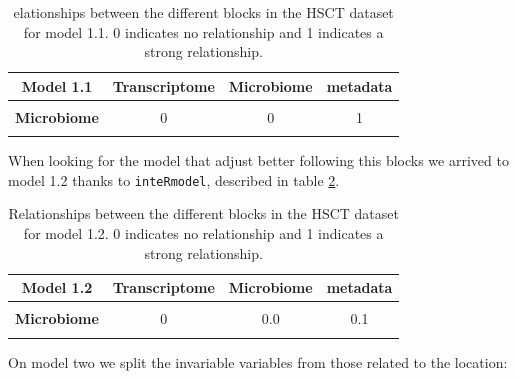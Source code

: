 \documentclass[
  12pt,
  a4paper,
  twoside,
  openright]{book}
\begin{document}
\begin{table}[H]

\caption[Model 1.1 the of HSCT dataset.]{\label{tab:hsct-model1-1}elationships between the different blocks in the HSCT dataset for model 1.1. 0 indicates no relationship and 1 indicates a strong relationship.}
\centering
\begin{tabular}[t]{>{}c|c|c|c}
\hline
\textbf{Model 1.1} & \textbf{Transcriptome} & \textbf{Microbiome} & \textbf{metadata}\\
\hline
\textbf{\cellcolor{gray!6}{Transcriptome}} & \cellcolor{gray!6}{0} & \cellcolor{gray!6}{0} & \cellcolor{gray!6}{1}\\
\hline
\textbf{Microbiome} & 0 & 0 & 1\\
\hline
\textbf{\cellcolor{gray!6}{metadata}} & \cellcolor{gray!6}{1} & \cellcolor{gray!6}{1} & \cellcolor{gray!6}{0}\\
\hline
\end{tabular}
\end{table}

When looking for the model that adjust better following this blocks we arrived to model 1.2 thanks to \texttt{inteRmodel}, described in table \ref{tab:hsct-model1-2}.

\begin{table}[H]

\caption[Model 1.2 of the HSCT dataset.]{\label{tab:hsct-model1-2}Relationships between the different blocks in the HSCT dataset for model 1.2. 0 indicates no relationship and 1 indicates a strong relationship.}
\centering
\begin{tabular}[t]{>{}c|c|c|c}
\hline
\textbf{Model 1.2} & \textbf{Transcriptome} & \textbf{Microbiome} & \textbf{metadata}\\
\hline
\textbf{\cellcolor{gray!6}{Transcriptome}} & \cellcolor{gray!6}{0} & \cellcolor{gray!6}{0.0} & \cellcolor{gray!6}{1.0}\\
\hline
\textbf{Microbiome} & 0 & 0.0 & 0.1\\
\hline
\textbf{\cellcolor{gray!6}{metadata}} & \cellcolor{gray!6}{1} & \cellcolor{gray!6}{0.1} & \cellcolor{gray!6}{0.0}\\
\hline
\end{tabular}
\end{table}

On model two we split the invariable variables from those related to the location:
\end{document}
